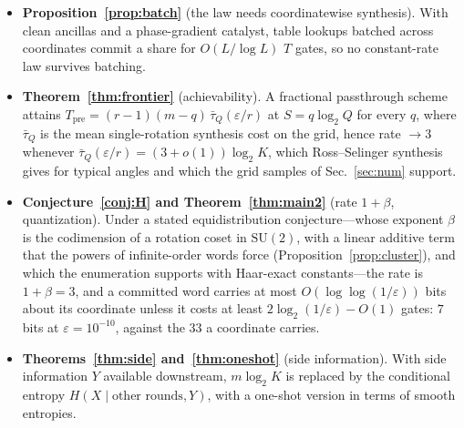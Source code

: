 \documentclass[aps,prx,twocolumn,superscriptaddress,nofootinbib,longbibliography]{revtex4-2}
\theoremstyle{plain}
\theoremstyle{definition}
\theoremstyle{remark}
\newcommand{\Tpre}{T_{\mathrm{pre}}}
\newcommand{\SU}{\mathrm{SU}(2)}
\begin{document}
\begin{itemize}
\item \textbf{Proposition~\ref{prop:batch}} (the law needs coordinatewise synthesis). With clean ancillas and a phase-gradient catalyst, table lookups batched across coordinates commit a share for $O(L/\log L)$ $T$ gates, so no constant-rate law survives batching.
\item \textbf{Theorem~\ref{thm:frontier}} (achievability). A fractional passthrough scheme attains $\Tpre=(r-1)(m-q)\,\bar\tau_Q(\varepsilon/r)$ at $S=q\log_2Q$ for every $q$, where $\bar\tau_Q$ is the mean single-rotation synthesis cost on the grid, hence rate $\to3$ whenever $\bar\tau_Q(\varepsilon/r)=(3+o(1))\log_2K$, which Ross--Selinger synthesis gives for typical angles and which the grid samples of Sec.~\ref{sec:num} support.
\item \textbf{Conjecture~\ref{conj:H} and Theorem~\ref{thm:main2}} (rate $1+\beta$, quantization). Under a stated equidistribution conjecture---whose exponent $\beta$ is the codimension of a rotation coset in $\SU$, with a linear additive term that the powers of infinite-order words force (Proposition~\ref{prop:cluster}), and which the enumeration supports with Haar-exact constants---the rate is $1+\beta=3$, and a committed word carries at most $O(\log\log(1/\varepsilon))$ bits about its coordinate unless it costs at least $2\log_2(1/\varepsilon)-O(1)$ gates: $7$ bits at $\varepsilon=10^{-10}$, against the $33$ a coordinate carries.
\item \textbf{Theorems~\ref{thm:side} and~\ref{thm:oneshot}} (side information). With side information $Y$ available downstream, $m\log_2K$ is replaced by the conditional entropy $H(X\mid\text{other rounds},Y)$, with a one-shot version in terms of smooth entropies.
\end{itemize}
\end{document}
